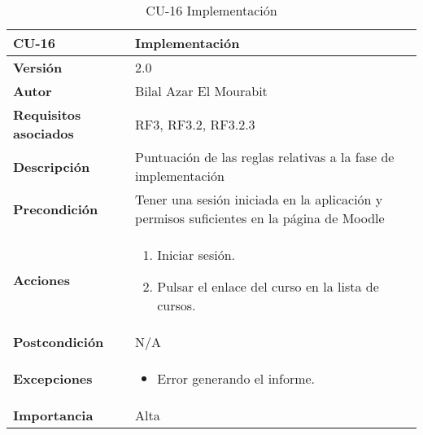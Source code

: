 \begin{table}[H]
	\centering
	\begin{tabularx}{\linewidth}{ p{} p{} }
		\toprule
		\textbf{CU-16}    & \textbf{Implementación}\\
		\toprule
		\textbf{Versión}              & 2.0    \\
		\textbf{Autor}                & Bilal Azar El Mourabit \\
		\textbf{Requisitos asociados} & RF3, RF3.2, RF3.2.3 \\
		\textbf{Descripción}          & Puntuación de las reglas relativas a la fase de implementación\\
    		\textbf{Precondición}         & Tener una sesión iniciada en la aplicación y permisos suficientes en la página de Moodle \\
		\textbf{Acciones}             & 
		\begin{enumerate}
			\def\labelenumi{\arabic{enumi}.}
			\tightlist
			\item Iniciar sesión.
            \item Pulsar el enlace del curso en la lista de cursos. 
		\end{enumerate}\\
		\textbf{Postcondición}        & N/A \\
		\textbf{Excepciones}          & \begin{itemize}
		    \item Error generando el informe.
		\end{itemize} \\
		\textbf{Importancia}          & Alta \\
		\bottomrule
	\end{tabularx}
	\caption{CU-16 Implementación}
\end{table}

